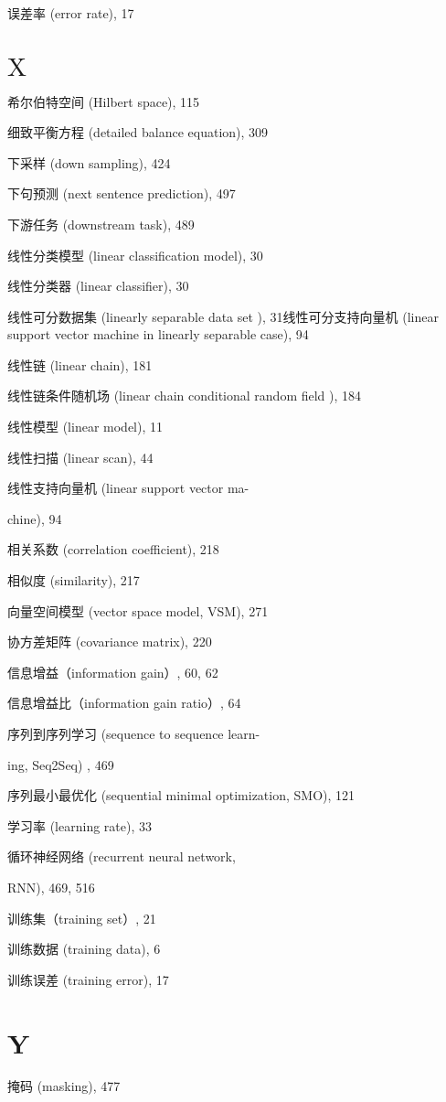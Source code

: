 \documentclass[10pt]{article}
\begin{document}
误差率 (error rate), 17

\section*{$\mathrm{X}$}
希尔伯特空间 (Hilbert space), 115

细致平衡方程 (detailed balance equation), 309

下采样 (down sampling), 424

下句预测 (next sentence prediction), 497

下游任务 (downstream task), 489

线性分类模型 (linear classification model), 30

线性分类器 (linear classifier), 30

线性可分数据集 (linearly separable data set ), 31线性可分支持向量机 (linear support vector machine in linearly separable case), 94

线性链 (linear chain), 181

线性链条件随机场 (linear chain conditional random field ), 184

线性模型 (linear model), 11

线性扫描 (linear scan), 44

线性支持向量机 (linear support vector ma-

chine), 94

相关系数 (correlation coefficient), 218

相似度 (similarity), 217

向量空间模型 (vector space model, VSM), 271

协方差矩阵 (covariance matrix), 220

信息增益（information gain）, 60, 62

信息增益比（information gain ratio）, 64

序列到序列学习 (sequence to sequence learn-

ing, Seq2Seq) , 469

序列最小最优化 (sequential minimal optimization, SMO), 121

学习率 (learning rate), 33

循环神经网络 (recurrent neural network,

RNN), 469, 516

训练集（training set）, 21

训练数据 (training data), 6

训练误差 (training error), 17

\section*{Y}
掩码 (masking), 477
\end{document}
